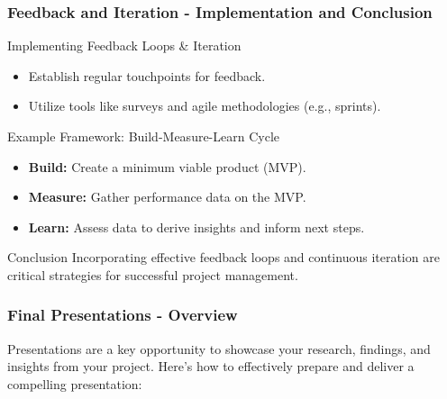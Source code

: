 \documentclass{beamer}
\begin{document}
\begin{frame}[fragile]
    \frametitle{Feedback and Iteration - Implementation and Conclusion}
    \begin{block}{Implementing Feedback Loops & Iteration}
        \begin{itemize}
            \item Establish regular touchpoints for feedback.
            \item Utilize tools like surveys and agile methodologies (e.g., sprints).
        \end{itemize}
    \end{block}
    \begin{block}{Example Framework: Build-Measure-Learn Cycle}
        \begin{itemize}
            \item \textbf{Build:} Create a minimum viable product (MVP).
            \item \textbf{Measure:} Gather performance data on the MVP.
            \item \textbf{Learn:} Assess data to derive insights and inform next steps.
        \end{itemize}
    \end{block}
    \begin{block}{Conclusion}
        Incorporating effective feedback loops and continuous iteration are critical strategies for successful project management.
    \end{block}
\end{frame}

\begin{frame}[fragile]
    \frametitle{Final Presentations - Overview}
    Presentations are a key opportunity to showcase your research, findings, and insights from your project. Here’s how to effectively prepare and deliver a compelling presentation:
\end{frame}
\end{document}
